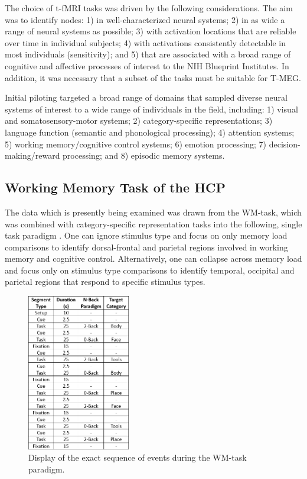 The choice of \gls{t-fMRI} tasks was driven by the following considerations. The aim was to identify nodes: 1) in well-characterized neural systems; 2) in as wide a range of neural systems as possible; 3) with activation locations that are reliable over time in individual subjects; 4) with activations consistently detectable in most individuals (sensitivity); and 5) that are associated with a broad range of cognitive and affective processes of interest to the \gls{NIH} Blueprint Institutes. In addition, it was necessary that a subset of the tasks must be suitable for \gls{T-MEG}.

Initial piloting targeted a broad range of domains that sampled diverse neural systems of interest to a wide range of individuals in the field, including: 1) visual and somatosensory-motor systems; 2) category-specific representations; 3) language function (semantic and phonological processing); 4) attention systems; 5) working memory/cognitive control systems; 6) emotion processing; 7) decision-making/reward processing; and 8) episodic memory systems.

\subsection{Working Memory Task of the HCP}

The data which is presently being examined was drawn from the \gls{WM}-task, which was combined with category-specific representation tasks into the following, single task paradigm \cite{HCP_Task}. One can ignore stimulus type and focus on only memory load comparisons to identify dorsal-frontal and parietal regions involved in working memory and cognitive control. Alternatively, one can collapse across memory load and focus only on stimulus type comparisons to identify temporal, occipital and parietal regions that respond to specific stimulus types.

\begin{figure}
    \centering
    \includegraphics[width=0.4\textwidth]{assets/images/WM_mat.png}
    \caption[]{Display of the exact sequence of events during the \gls{WM}-task paradigm.}
    \label{tab:WM_mat}
\end{figure}

